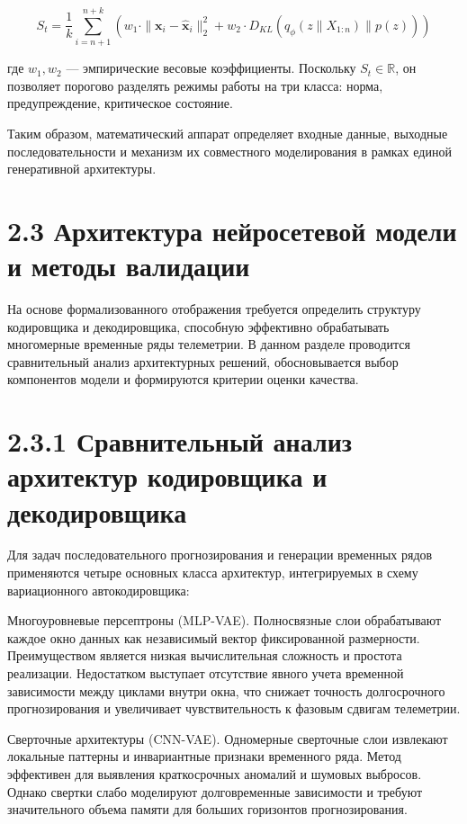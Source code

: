 \documentclass[14pt, a4paper, oneside]{extreport}
\begin{document}
\begin{equation}
S_t = \frac{1}{k} \sum_{i=n+1}^{n+k} \left( w_1 \cdot \|\mathbf{x}_i - \hat{\mathbf{x}}_i\|_2^2 + w_2 \cdot D_{KL}(q_\phi(z\|X_{1:n}) \| p(z)) \right)
\end{equation}

где $w_1, w_2$ — эмпирические весовые коэффициенты. Поскольку $S_t \in \mathbb{R}$, он позволяет порогово разделять режимы работы на три класса: норма, предупреждение, критическое состояние.

Таким образом, математический аппарат определяет входные данные, выходные последовательности и механизм их совместного моделирования в рамках единой генеративной архитектуры.



\section{2.3 Архитектура нейросетевой модели и методы валидации}

На основе формализованного отображения требуется определить структуру кодировщика и декодировщика, способную эффективно обрабатывать многомерные временные ряды телеметрии. В данном разделе проводится сравнительный анализ архитектурных решений, обосновывается выбор компонентов модели и формируются критерии оценки качества.


\vspace{1em}
\section{2.3.1 Сравнительный анализ архитектур кодировщика и декодировщика}
\vspace{1em}

Для задач последовательного прогнозирования и генерации временных рядов применяются четыре основных класса архитектур, интегрируемых в схему вариационного автокодировщика:

Многоуровневые персептроны (MLP-VAE). Полносвязные слои обрабатывают каждое окно данных как независимый вектор фиксированной размерности. Преимуществом является низкая вычислительная сложность и простота реализации. Недостатком выступает отсутствие явного учета временной зависимости между циклами внутри окна, что снижает точность долгосрочного прогнозирования и увеличивает чувствительность к фазовым сдвигам телеметрии.

Сверточные архитектуры (CNN-VAE). Одномерные сверточные слои извлекают локальные паттерны и инвариантные признаки временного ряда. Метод эффективен для выявления краткосрочных аномалий и шумовых выбросов. Однако свертки слабо моделируют долговременные зависимости и требуют значительного объема памяти для больших горизонтов прогнозирования.
\end{document}

